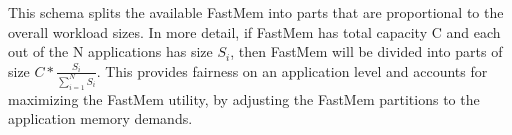 This schema splits the available FastMem into parts that are proportional to the overall workload sizes. In more detail, if FastMem has total capacity C and 
each out of the N applications has size $S_i$, then FastMem will be divided into parts of size $C*\frac{S_i}{\sum_{i=1}^{N}S_i}$. This provides fairness on an application level and 
accounts for maximizing the FastMem utility, by adjusting the FastMem partitions to the application memory demands. \\



\vspace{0.6ex}
\vspace{0.3ex} 


